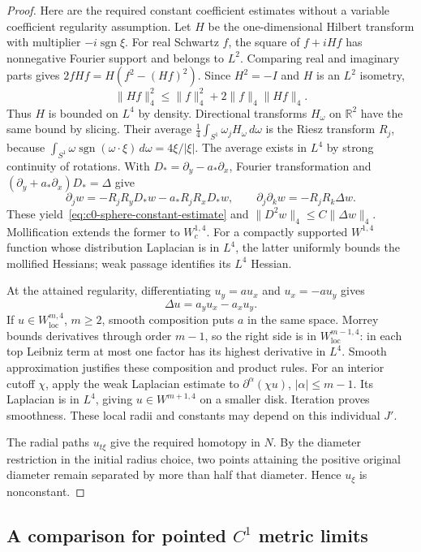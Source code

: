 \documentclass[11pt]{article}
\numberwithin{equation}{section}
\theoremstyle{definition}
\theoremstyle{remark}
\newcommand{\R}{\mathbb R}
\begin{document}
\begin{proof}
Here are the required constant coefficient estimates without
a variable coefficient regularity assumption. Let $H$ be the
one-dimensional Hilbert transform with multiplier
$-i\operatorname{sgn}\xi$. For real Schwartz $f$, the square
of $f+iHf$ has nonnegative Fourier support and belongs to
$L^2$. Comparing real and imaginary parts gives
$2fHf=H(f^2-(Hf)^2)$. Since $H^2=-I$ and $H$ is an
$L^2$ isometry,
\[
 \|Hf\|_4^2\le\|f\|_4^2+2\|f\|_4\|Hf\|_4.
\]
Thus $H$ is bounded on $L^4$ by density. Directional transforms
$H_\omega$ on $\R^2$ have the same bound by slicing.
Their average $\tfrac14\int_{S^1}\omega_jH_\omega\,d\omega$
is the Riesz transform $R_j$, because
$\int_{S^1}\omega\operatorname{sgn}(\omega\cdot\xi)\,d\omega
=4\xi/|\xi|$. The average exists in $L^4$ by strong
continuity of rotations. With $D_*=\partial_y-a_*\partial_x$,
Fourier transformation and
$(\partial_y+a_*\partial_x)D_*=\Delta$ give
\[
 \partial_jw=-R_jR_yD_*w-a_*R_jR_xD_*w,\qquad
 \partial_j\partial_kw=-R_jR_k\Delta w.
\]
These yield~\eqref{eq:c0-sphere-constant-estimate} and
$\|D^2w\|_4\le C\|\Delta w\|_4$.
Mollification extends the former to $W^{1,4}_c$.
For a compactly supported $W^{1,4}$ function whose distribution
Laplacian is in $L^4$, the latter uniformly bounds the
mollified Hessians; weak passage identifies its $L^4$ Hessian.

At the attained regularity, differentiating $u_y=a u_x$ and
$u_x=-a u_y$ gives
\[
 \Delta u=a_yu_x-a_xu_y.
\]
If $u\in W^{m,4}_{\mathrm{loc}}$, $m\ge2$, smooth composition
puts $a$ in the same space. Morrey bounds derivatives through
order $m-1$, so the right side is in $W^{m-1,4}_{\mathrm{loc}}$:
in each top Leibniz term at most one factor has its highest
derivative in $L^4$. Smooth approximation justifies these
composition and product rules. For an interior cutoff $\chi$,
apply the weak Laplacian estimate to
$\partial^\alpha(\chi u)$, $|\alpha|\le m-1$. Its Laplacian
is in $L^4$, giving $u\in W^{m+1,4}$ on a smaller disk.
Iteration proves smoothness. These local radii and constants
may depend on this individual $J'$.

The radial paths $u_{t\xi}$ give the required homotopy in $N$.
By the diameter restriction in the initial radius choice, two points
attaining the positive original diameter remain separated by
more than half that diameter. Hence $u_\xi$ is nonconstant.
\end{proof}

\subsection{A comparison for pointed \texorpdfstring{$C^1$}{C1} metric limits}
\end{document}
